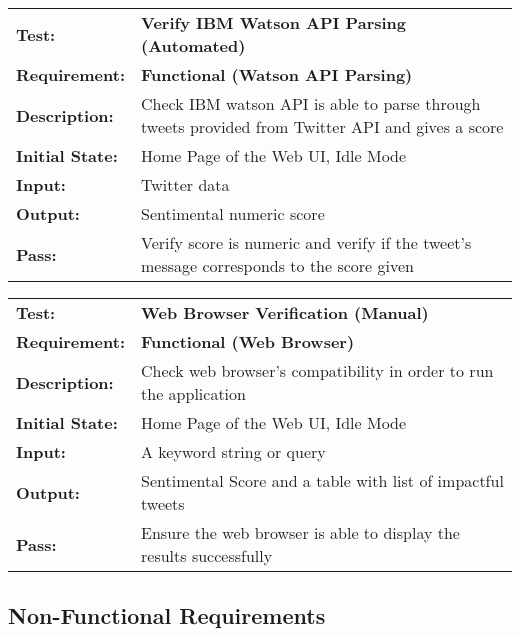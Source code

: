 \documentclass{article}
\begin{document}
	\begin{mdframed}[linewidth=1pt]%
	\begin{tabularx}{\textwidth}{@{}p{3cm}X@{}}
	{\bf Test:} & {\bf Verify IBM Watson API Parsing (Automated)}\\[\baselineskip]
	{\bf Requirement:} & {\bf Functional (Watson API Parsing)}\\[\baselineskip]
	{\bf Description:} & Check IBM watson API is able to parse through tweets provided from Twitter API and gives a score \\[0.5\baselineskip]
	{\bf Initial State:} &  Home Page of the Web UI, Idle Mode\\[0.5\baselineskip]
	{\bf Input:} &  Twitter data\\[0.5\baselineskip]
	{\bf Output:} & Sentimental numeric score\\[0.5\baselineskip]
	{\bf Pass:} & Verify score is numeric and verify if the tweet's message corresponds to the score given
	\end{tabularx}
	\end{mdframed}

	\begin{mdframed}[linewidth=1pt]%
	\begin{tabularx}{\textwidth}{@{}p{3cm}X@{}}
	{\bf Test:} & {\bf Web Browser Verification (Manual)}\\[\baselineskip]
	{\bf Requirement:} & {\bf Functional (Web Browser)}\\[\baselineskip]
	{\bf Description:} & Check web browser's compatibility in order to run the application\\[0.5\baselineskip]
	{\bf Initial State:} &  Home Page of the Web UI, Idle Mode\\[0.5\baselineskip]
	{\bf Input:} &  A keyword string or query\\[0.5\baselineskip]
	{\bf Output:} & Sentimental Score and a table with list of impactful tweets\\[0.5\baselineskip]
	{\bf Pass:} & Ensure the web browser is able to display the results successfully
	\end{tabularx}
	\end{mdframed}

		
	\newpage
	\subsection{Non-Functional Requirements}
\end{document}
